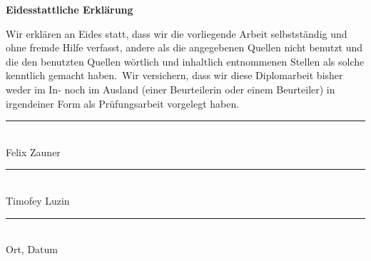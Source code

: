 \documentclass[twoside]{scrreprt}
\begin{document}

\begin{center}
  {\LARGE\bfseries Eidesstattliche Erklärung}
\end{center}

\setlength{\parskip}{4pt}
\noindent
Wir erklären an Eides statt, dass wir die vorliegende Arbeit selbstständig
und ohne fremde Hilfe verfasst, andere als die angegebenen Quellen nicht benutzt
und die den benutzten Quellen wörtlich und inhaltlich entnommenen Stellen als
solche kenntlich gemacht haben.\
Wir versichern, dass wir diese Diplomarbeit bisher weder im In- noch im Ausland
(einer Beurteilerin oder einem Beurteiler) in irgendeiner Form als
Prüfungsarbeit vorgelegt haben.

\vspace{20mm}

\begin{center}
  \begin{minipage}{0.85\textwidth}\centering
    \begin{minipage}{0.4\textwidth}\centering
      \rule{40mm}{0.5pt}\\[-1mm]
      Felix Zauner
    \end{minipage}
    \hfill
    \begin{minipage}{0.4\textwidth}\centering
      \rule{40mm}{0.5pt}\\[-1mm]
      Timofey Luzin
    \end{minipage}
  \end{minipage}

  \vspace{25mm}

  \begin{minipage}{0.6\textwidth}\centering
    \rule{65mm}{0.5pt}\\[-1mm]
    Ort, Datum
  \end{minipage}
\end{center}

\newpage

%
%
%
%
%
%
%
%
% 
%
%
\end{document}
